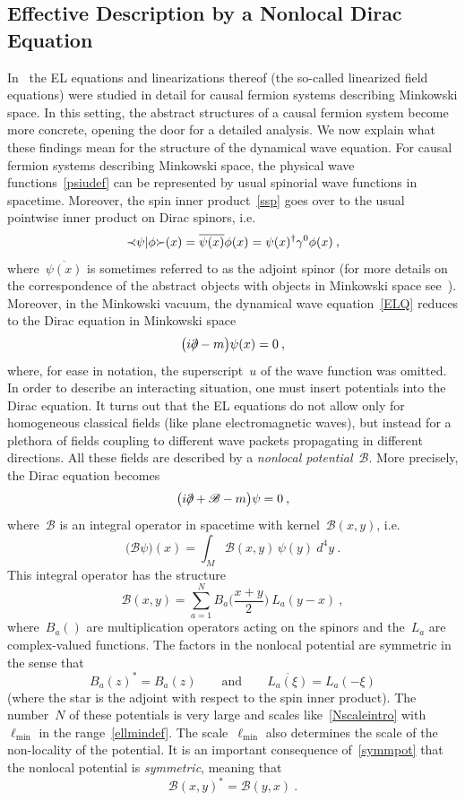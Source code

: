 \documentclass[reqno,11pt]{amsart}
\numberwithin{equation}{section}
\newcommand{\beq}{\begin{equation}}
\newcommand{\eeq}{\end{equation}}
\newcommand{\Sl}{\mbox{$\prec \!\!$ \nolinebreak}}
\newcommand{\Sr}{\mbox{\nolinebreak $\succ$}}
\newcommand{\1}{\mathds{1}}
\newcommand{\Pdd}{\mbox{$\partial$ \hspace{-1.2 em} $/$}}
\newcommand{\B}{{\mathscr{B}}}
\begin{document}
\subsection{Effective Description by a Nonlocal Dirac Equation} \label{secdir}
In~\cite{nonlocal} the EL equations and linearizations thereof (the so-called linearized field equations)
were studied in detail for causal fermion systems describing Minkowski space.
In this setting, the abstract structures of a causal fermion system become more concrete,
opening the door for a detailed analysis.
We now explain what these findings mean for the structure of the dynamical wave equation.
For causal fermion systems describing Minkowski space, the physical wave functions~\eqref{psiudef} can be represented
by usual spinorial wave functions in spacetime. Moreover, the spin inner product~\eqref{ssp}
goes over to the usual pointwise inner product on Dirac spinors, i.e.\
\beq \label{sip}
\Sl \psi | \phi \Sr(x) = \overline{\psi(x)} \phi(x) = \psi(x)^\dagger \gamma^0 \phi(x) \:,
\eeq
where~$\overline{\psi(x)}$ is sometimes referred to as the adjoint spinor
(for more details on the correspondence of the abstract objects with objects in Minkowski space
see~\cite[Section~1.2]{cfs}).
Moreover, in the Minkowski vacuum, the dynamical wave equation~\eqref{ELQ} reduces to the Dirac equation
in Minkowski space
\[ \big( i \Pdd - m \big) \psi(x) = 0 \:, \]
where, for ease in notation, the superscript~$u$ of the wave function was omitted.
In order to describe an interacting situation, one must insert potentials into the Dirac equation. It turns out that
the EL equations do not allow only for homogeneous classical fields
(like plane electromagnetic waves), but instead for a plethora of fields coupling to different wave
packets propagating in different directions. All these fields are described by a {\em{nonlocal potential}}~$\B$.
More precisely, the Dirac equation becomes
\beq \label{dirnonloc}
\big( i \Pdd + \B - m \big) \psi = 0 \:,
\eeq
where~$\B$ is an integral operator in spacetime with kernel~$\B(x,y)$, i.e.\
\beq \label{Bnonlocal}
\big( \B \psi \big)(x) = \int_M \B(x,y)\, \psi(y)\: d^4y \:.
\eeq
This integral operator has the structure
\beq \label{Bstochastic}
\B(x,y) = \sum_{a=1}^N B_a \Big( \frac{x+y}{2} \Big) \:L_a(y-x)\:,
\eeq
where~$B_a()$ are multiplication operators acting on the spinors and the~$L_a$ are 
complex-valued functions. The factors in the nonlocal potential are symmetric in the sense that
\beq \label{symmpot}
B_a(z)^* = B_a(z) \qquad \text{and} \qquad \overline{L_a(\xi)} = L_a(-\xi)
\eeq
(where the star is the adjoint with respect to the spin inner product).
The number~$N$ of these potentials is very large and scales like~\eqref{Nscaleintro}
with~$\ell_{\min}$ in the range~\eqref{ellmindef}.
The scale~$\ell_{\min}$ also determines the scale of the non-locality of the potential.
It is an important consequence of~\eqref{symmpot} that the nonlocal potential
is {\em{symmetric}}, meaning that
\beq \label{Bsymm}
\B(x,y)^* = \B(y,x) \:.
\eeq
\end{document}
